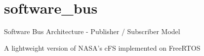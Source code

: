 \chapter{software\+\_\+bus }
\hypertarget{md_doc_2software__bus}{}\label{md_doc_2software__bus}
Software Bus Architecture -\/ Publisher /\+ Subscriber Model

A lightweight version of NASA’s c\+FS implemented on Free\+RTOS 